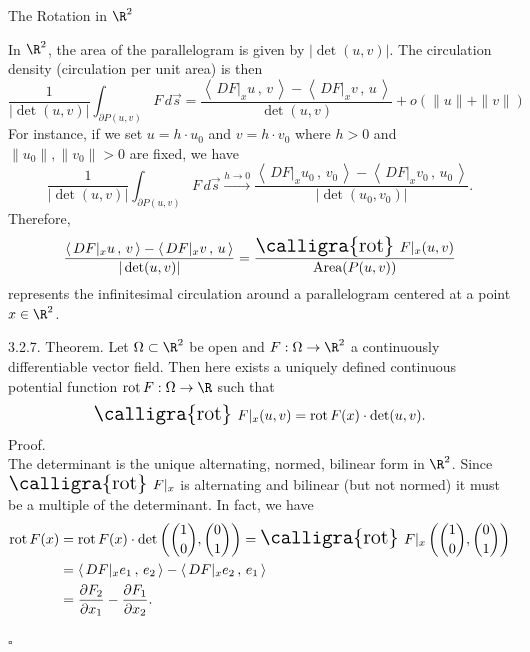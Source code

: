 \documentclass[smaller,hyperref={CJKbookmarks=true}]{beamer}
\newcommand{\scp}[2]{\left\langle\,#1\,,\,#2\,\right\rangle} \newcommand{\scpp}{\langle\,\cdot\,,\,\cdot\,\rangle}
\newcommand{\rot}{\text{\Large{\calligra{rot}}\,}}
\begin{document}
\begin{frame}{The Rotation in $\R^2$}
\begin{spacing}{1}
In $\R^2$, the area of the parallelogram is given by $|\det(u,v)|$. The circulation
density (circulation per unit area) is then
\[\frac{1}{|\det(u,v)|}\int_{\partial P(u,v)}F\,d\vec{s}=\frac{\scp{DF|_xu}{v}-\scp{DF|_xv}{u}}{\det(u,v)}
+o(\|u\|+\|v\|)\]
For instance, if we set $u=h\cdot u_0$ and $v=h\cdot v_0$ where $h>0$ and $\|u_0\|,\|v_0\|>0$ are fixed, we have
\[\frac{1}{|\det(u,v)|}\int_{\partial P(u,v)}F\,d\vec{s}\xrightarrow[]{h\to0}
\frac{\scp{DF|_xu_0}{v_0}-\scp{DF|_xv_0}{u_0}}{|\det(u_0,v_0)|}.\]
Therefore,
\begin{equation}\label{3.2.4}
\frac{\scp{DF|_xu}{v}-\scp{DF|_xv}{u}}{\vert\det(u,v)\vert}
=\frac{\rot\,F|_x(u,v)}{\text{Area}(P(u,v))}
\end{equation}
\vspace*{-2pt}
represents the infinitesimal circulation around a parallelogram centered at
a point $x\in\R^2$.
\end{spacing}
\newpage
\begin{spacing}{0.9}
\alert{3.2.7. Theorem.} Let $\Omega\subset\R^2$ be open and $F:\Omega\to\R^2$ a continuously dif{}ferentiable vector field. Then here exists a uniquely defined continuous potential function $\text{rot}\,F:\Omega\to\R$ such that
\begin{equation}\label{3.2.5}
  \rot\,F|_x(u,v)=\text{rot}\,F(x)\cdot
  \det(u,v).
\end{equation}
\alert{Proof.}\\
The determinant is the unique alternating, normed, bilinear form in $\R^2$. Since $\rot\,F|_x$ is alternating and bilinear (but not normed) it must be a multiple of the determinant. In fact, we have
\begin{equation*}
  \begin{split}
     \text{rot}\,F(x) &=\text{rot}\,F(x)\cdot\det\left(
     \binom{1}{0},\binom{0}{1}\right)=\rot\,
     F|_x\left(\binom{1}{0},\binom{0}{1}\right) \\
       &=\scp{DF|_xe_1}{e_2}-\scp{DF|_xe_2}{e_1} \\
       &=\frac{\partial F_2}{\partial x_1}-\frac{\partial F_1}{\partial x_2}.
  \end{split}
\end{equation*}
\begin{flushright}
  $\square$
\end{flushright}
\end{spacing}

\end{frame}
\end{document}
